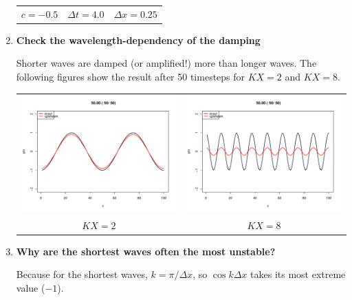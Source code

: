 \documentclass[a4paper,fleqn]{article}
\begin{document}
\begin{enumerate}
\begin{center}
\begin{tabular}{ccc}
				$c=-0.5$	&	$\Delta t=4.0$	&	$\Delta x=0.25$
			\end{tabular}\hspace*{-50mm}
		\end{center}\vspace{2ex}
	\item \textbf{Check the wavelength-dependency of the damping}
		\par
		Shorter waves are damped (or amplified!) more than longer waves. The following figures show the result after 50 timesteps for $KX=2$ and $KX=8$.
		\begin{center}
			\hspace*{-50mm}
			\begin{tabular}{cc}
				\includegraphics[scale=0.3]{upstream_damp_long}	&	\includegraphics[scale=0.3]{upstream_damp_short}\\
				$KX=2$	&	$KX=8$
			\end{tabular}\hspace*{-50mm}
		\end{center}\vspace{2ex}
	\item \textbf{Why are the shortest waves often the most unstable?}
		\par
		Because for the shortest waves, $k=\pi/\Delta x$, so $\cos k\Delta x$ takes its most extreme value ($-1$).
\end{enumerate}
%
\end{document}
